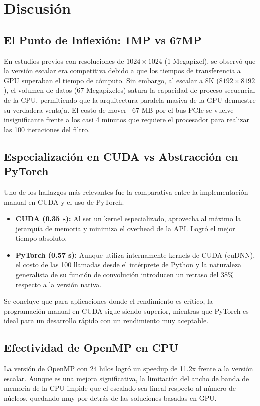 \section{Discusión}

\subsection{El Punto de Inflexión: 1MP vs 67MP}
En estudios previos con resoluciones de $1024 \times 1024$ (1 Megapíxel), se observó que la versión escalar era competitiva debido a que los tiempos de transferencia a GPU superaban el tiempo de cómputo. Sin embargo, al escalar a 8K ($8192 \times 8192$), el volumen de datos (67 Megapíxeles) satura la capacidad de proceso secuencial de la CPU, permitiendo que la arquitectura paralela masiva de la GPU demuestre su verdadera ventaja. El costo de mover ~67 MB por el bus PCIe se vuelve insignificante frente a los casi 4 minutos que requiere el procesador para realizar las 100 iteraciones del filtro.

\subsection{Especialización en CUDA vs Abstracción en PyTorch}
Uno de los hallazgos más relevantes fue la comparativa entre la implementación manual en CUDA y el uso de PyTorch. 
\begin{itemize}
    \item \textbf{CUDA (0.35 s):} Al ser un kernel especializado, aprovecha al máximo la jerarquía de memoria y minimiza el overhead de la API. Logró el mejor tiempo absoluto.
    \item \textbf{PyTorch (0.57 s):} Aunque utiliza internamente kernels de CUDA (cuDNN), el costo de las 100 llamadas desde el intérprete de Python y la naturaleza generalista de su función de convolución introducen un retraso del 38\% respecto a la versión nativa.
\end{itemize}

Se concluye que para aplicaciones donde el rendimiento es crítico, la programación manual en CUDA sigue siendo superior, mientras que PyTorch es ideal para un desarrollo rápido con un rendimiento muy aceptable.

\subsection{Efectividad de OpenMP en CPU}
La versión de OpenMP con 24 hilos logró un speedup de 11.2x frente a la versión escalar. Aunque es una mejora significativa, la limitación del ancho de banda de memoria de la CPU impide que el escalado sea lineal respecto al número de núcleos, quedando muy por detrás de las soluciones basadas en GPU.

